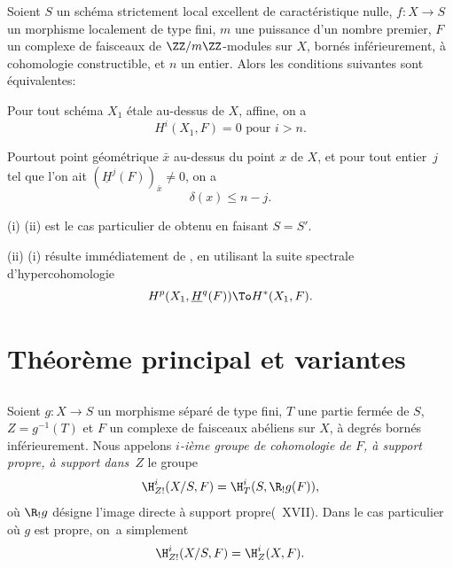 \begin{corollaire} \label{XIV.3.7}
Soient $S$ un sch\'ema strictement local excellent de caract\'eristique nulle, $f:X \to S$ un morphisme localement de type fini, $m$ une puissance d'un nombre premier, $F$ un complexe de faisceaux de $\ZZ/m\ZZ$-modules sur $X$, born\'es inf\'erieurement, \`a cohomologie constructible, et $n$ un entier. Alors les conditions suivantes sont \'equivalentes:
\begin{enumeratei}
\item
Pour tout sch\'ema $X_1$ \'etale au-dessus de $X$, affine, on a
$$
H^i(X_1, F)=0\text{ pour }i>n.
$$

\item
Pour\pageoriginale tout point g\'eom\'etrique $\bar{x}$ au-dessus du point $x$ de $X$, et pour tout entier~$j$ tel que l'on ait $(\underline{H}^j(F))_{\bar{x}} \neq 0$, on a
$$
\delta(x) \leq n-j.
$$
\end{enumeratei}
\end{corollaire}

\textup{(i)} \ALORS \textup{(ii)} est le cas particulier de  obtenu en faisant $S=S'$.

\textup{(ii)} \ALORS \textup{(i)} r\'esulte imm\'ediatement de , en utilisant la suite spectrale d'hypercohomologie
$$
H^p(X_1, \underline{H}^q(F)) \To H^*(X_1, F).
$$

\section{Th\'eor\`eme principal et variantes} \label{XIV.4}

\setcounter{subsection}{-1}

\subsection{} \label{XIV.4.0}
Soient $g\colon X\to S$ un morphisme s\'epar\'e de type fini, $T$ une partie ferm\'ee de $S$, \hbox{$Z=g^{-1}(T)$} et $F$ un complexe de faisceaux ab\'eliens sur $X$, \`a degr\'es born\'es inf\'erieurement. Nous appelons \emph{$i$-i\`eme groupe de cohomologie de $F$, \`a support propre, \`a support dans~$Z$} le groupe
$$
\H_{Z!}^{i}(X/S, F)=\H_{T}^{i}(S, \R_{!}g(F)),
$$
o\`u $\R_{!}g$ d\'esigne \og l'image directe \`a support propre\fg (~XVII). Dans le cas particulier o\`u $g$ est propre, on~a simplement
$$
\H_{Z!}^{i}(X/S, F)=\H_{Z}^{i}(X, F).
$$

